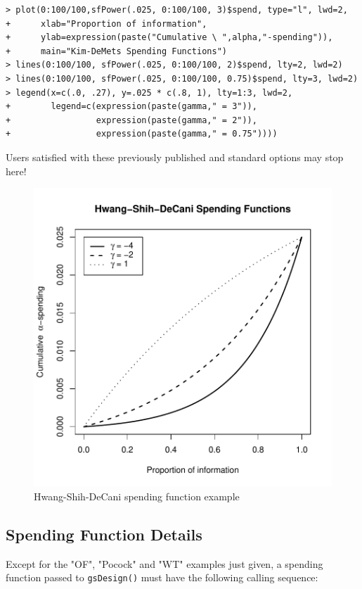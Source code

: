 \bigskip
\begin{verbatim}
> plot(0:100/100,sfPower(.025, 0:100/100, 3)$spend, type="l", lwd=2,
+      xlab="Proportion of information",
+      ylab=expression(paste("Cumulative \ ",alpha,"-spending")),
+      main="Kim-DeMets Spending Functions")
> lines(0:100/100, sfPower(.025, 0:100/100, 2)$spend, lty=2, lwd=2)
> lines(0:100/100, sfPower(.025, 0:100/100, 0.75)$spend, lty=3, lwd=2)
> legend(x=c(.0, .27), y=.025 * c(.8, 1), lty=1:3, lwd=2,
+        legend=c(expression(paste(gamma," = 3")),
+                 expression(paste(gamma," = 2")),
+                 expression(paste(gamma," = 0.75"))))
\end{verbatim}

\bigskip 
Users satisfied with these previously published and standard options
may stop here!

\begin{center}%
\begin{figure}
\begin{center}
\includegraphics[width=.6\textwidth]{figs/HSDexample.pdf}
\end{center}
\caption{Hwang-Shih-DeCani spending function example\label{fig:hsd}}
\end{figure}%

\end{center}

\subsection{Spending Function Details}

Except for the "OF", "Pocock" and "WT" examples just given, a spending
function passed to \texttt{gsDesign()} must have the following calling sequence:

